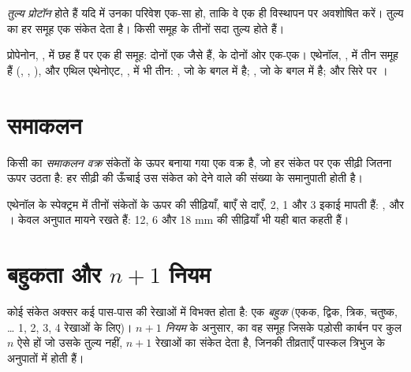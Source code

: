 \begin{definition}[तुल्य प्रोटॉन]\label{def:g12:proton-nmr:equivalent}
 \emph{तुल्य प्रोटॉन} होते हैं यदि  में
उनका परिवेश एक-सा हो, ताकि वे एक ही
विस्थापन पर अवशोषित करें। तुल्य  का हर समूह एक संकेत देता है। किसी
 समूह के तीनों  सदा तुल्य होते हैं।
\end{definition}

\begin{example}[समूह गिनना]\label{ex:g12:proton-nmr:groups}
प्रोपेनोन, , में छह  हैं पर एक ही समूह: दोनों
 एक जैसे हैं,  के दोनों ओर एक-एक। एथेनॉल,
, में तीन समूह हैं (, , ), और
एथिल एथेनोएट, , में भी तीन: , जो
 के बगल में है; , जो  के बगल में है; और सिरे पर
।
\end{example}

\section{समाकलन}

\begin{definition}[समाकलन वक्र]\label{def:g12:proton-nmr:integration}
किसी  का \emph{समाकलन वक्र}
संकेतों के ऊपर बनाया गया एक वक्र है, जो हर संकेत पर एक सीढ़ी जितना ऊपर उठता है:
हर सीढ़ी की ऊँचाई उस संकेत को देने वाले  की संख्या के
समानुपाती होती है।
\end{definition}

\begin{example}[सीढ़ियाँ पढ़ना]\label{ex:g12:proton-nmr:steps}
एथेनॉल के स्पेक्ट्रम में तीनों संकेतों के ऊपर की सीढ़ियाँ, बाएँ से दाएँ, 2,
1 और 3 इकाई मापती हैं: ,  और । केवल
अनुपात मायने रखते हैं: 12, 6 और 18 mm की सीढ़ियाँ भी यही बात कहती हैं।
\end{example}

\section{बहुकता और \texorpdfstring{$n+1$}{n+1} नियम}


\begin{definition}[बहुक, $n+1$ नियम]\label{def:g12:proton-nmr:multiplet}
कोई संकेत अक्सर कई पास-पास की रेखाओं में विभक्त होता है: एक \emph{बहुक}
(एकक, द्विक, त्रिक, चतुष्क, \dots{} 1, 2, 3, 4 रेखाओं के लिए)।
\emph{$n+1$ नियम} के अनुसार,  का वह समूह
जिसके पड़ोसी कार्बन  पर कुल $n$ ऐसे  हों जो उसके
तुल्य नहीं, $n+1$ रेखाओं का संकेत देता है, जिनकी तीव्रताएँ
पास्कल त्रिभुज के अनुपातों में होती हैं।
\end{definition}

